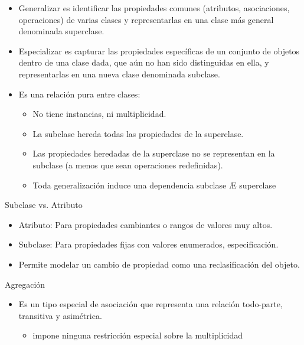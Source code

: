 \documentclass[12pt, twoside, openright]{report} %
\begin{document}
\begin{itemize}
	\item Generalizar es identificar las propiedades comunes (atributos,
	      asociaciones, operaciones) de varias clases y representarlas en
	      una clase más general denominada superclase.
	\item Especializar es capturar las propiedades específicas de un conjunto
	      de objetos dentro de una clase dada, que aún no han sido
	      distinguidas en ella, y representarlas en una nueva clase
	      denominada subclase.
	\item Es una relación pura entre clases:

	      \begin{itemize}
		      \item No tiene instancias, ni multiplicidad.
		      \item La subclase hereda todas las propiedades de la superclase.
		      \item Las propiedades heredadas de la superclase no se representan en
		            la subclase (a menos que sean operaciones redefinidas).
		      \item Toda generalización induce una dependencia subclase Æ superclase
	      \end{itemize}
\end{itemize}

Subclase vs. Atributo

\begin{itemize}
	\item Atributo: Para propiedades cambiantes o rangos de valores muy
	      altos.
	\item Subclase: Para propiedades fijas con valores enumerados,
	      especificación.
	\item Permite modelar un cambio de propiedad como una reclasificación
	      del objeto.
\end{itemize}
\pagebreak

Agregación    \vspace{-0.5cm}

\begin{figure}[H]
	{\def\svgwidth{.7\textwidth}
		}
\end{figure}
\begin{itemize}
	\vspace{-0.5cm}
	\item Es un tipo especial de asociación que representa una relación
	      todo-parte, transitiva y asimétrica.

	      \begin{itemize}
		      \item impone ninguna restricción especial sobre la multiplicidad
	      \end{itemize}
\end{itemize}
\end{document}
